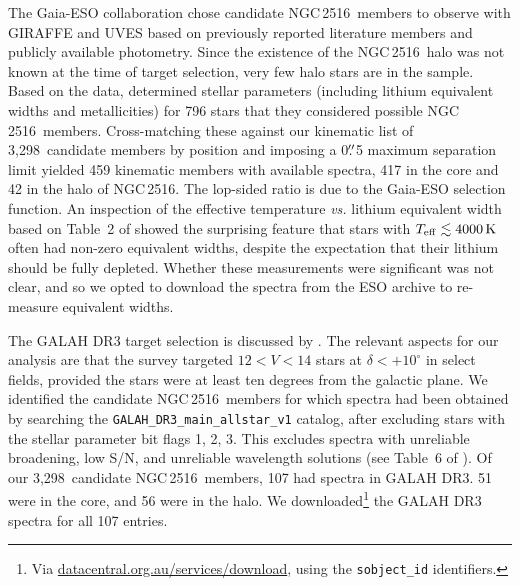 \documentclass[12pt,twocolumn,tighten]{aastex63}
\newcommand{\cn}{NGC\,2516} %
\newcommand{\nkinematic}{3{,}298} %
\begin{document}
The Gaia-ESO collaboration chose candidate \cn\ members to observe
with GIRAFFE and UVES based on previously reported literature members
and publicly available photometry.  Since the existence of the \cn\
halo was not known at the time of target selection, very few halo
stars are in the sample.  Based on the data,
\citet{randich_gaiaeso_2018} determined stellar parameters (including
lithium equivalent widths and metallicities) for 796 stars that they
considered possible \cn\ members.  Cross-matching these against our
kinematic list of \nkinematic\ candidate members by position and
imposing a 0$\mbox{$.\!\!^{\prime\prime}$}$5 maximum separation limit yielded 459 kinematic
members with available spectra, 417 in the core and 42 in the halo of
\cn.  The lop-sided ratio is due to the Gaia-ESO selection function.
An inspection of the effective temperature {\it vs{.}} lithium
equivalent width based on Table~2 of \citet{randich_gaiaeso_2018}
showed the surprising feature that stars with $T_{\rm eff}\lesssim
4000\,{\rm K}$ often had non-zero equivalent widths, despite the
expectation that their lithium should be fully depleted.  Whether
these measurements were significant was not clear, and so we opted to
download the spectra from the ESO archive to re-measure equivalent
widths.

The GALAH DR3 target selection is discussed by
\citet{buder_galah_2020}.  The relevant aspects for our analysis are
that the survey targeted $12<V<14$ stars at
$\delta<+10^\circ$ in select fields, provided the stars were at least
ten degrees from the galactic plane.  We identified the candidate \cn\ members
for which spectra had been obtained by searching the
\texttt{GALAH\_DR3\_main\_allstar\_v1} catalog, after excluding stars
with the stellar parameter bit flags 1, 2, 3.  This excludes spectra
with unreliable broadening, low S/N, and unreliable wavelength
solutions (see Table~6 of \citealt{buder_galah_2020}).
Of our \nkinematic\ candidate \cn\ members, 107 had spectra in GALAH
DR3.  51 were in the core, and 56 were in the halo.  We
downloaded\footnote{Via \url{datacentral.org.au/services/download},
using the \texttt{sobject\_id} identifiers.} the GALAH DR3 spectra for
all 107 entries.  

%
%
\end{document}
